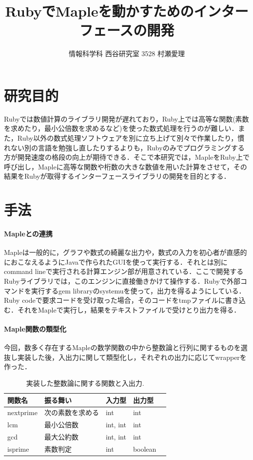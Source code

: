 \documentclass[10pt,a4j,twocolumn]{jsarticle}
\begin{document}
\title{RubyでMapleを動かすためのインターフェースの開発}
\author{情報科学科 西谷研究室 3528 村瀬愛理}
\date{}
\maketitle
\section{研究目的}
\vspace{-0.5em}
Rubyでは数値計算のライブラリ開発が遅れており，Ruby上では高等な関数(素数を求めたり，最小公倍数を求めるなど)を使った数式処理を行うのが難しい．また，Ruby以外の数式処理ソフトウェアを別に立ち上げて別々で作業したり，慣れない別の言語を勉強し直したりするよりも，Rubyのみでプログラミングする方が開発速度の格段の向上が期待できる．そこで本研究では，MapleをRuby上で呼び出し，Mapleに高等な関数や桁数の大きな数値を用いた計算をさせて，その結果をRubyが取得するインターフェースライブラリの開発を目的とする．

\section{手法}
\vspace{-0.5em}
\paragraph{Mapleとの連携}
Mapleは一般的に，グラフや数式の綺麗な出力や，数式の入力を初心者が直感的におこなえるようにJavaで作られたGUIを使って実行する．それとは別にcommand lineで実行される計算エンジン部が用意されている．ここで開発するRubyライブラリでは，このエンジンに直接働きかけて操作する．Rubyで外部コマンドを実行するgem libraryのsystemuを使って，出力を得るようにしている．Ruby codeで要求コードを受け取った場合，そのコードをtmpファイルに書き込む．それをMapleで実行し，結果をテキストファイルで受けとり出力を得る．

\paragraph{Maple関数の類型化}
今回，数多く存在するMapleの数学関数の中から整数論と行列に関するものを選抜し実装した後，入出力に関して類型化し，それぞれの出力に応じてwrapperを作った．
\begin{table}[htbp]\begin{center}
\caption{実装した整数論に関する関数と入出力.}
\label{table:one}
\begin{tabular}{lllll}
\hline
関数名  &振る舞い  &入力型  &出力型  \\ \hline
nextprime  &次の素数を求める  &int  &int  \\
lcm  &最小公倍数  &int, int  &int  \\
gcd  &最大公約数  &int, int  &int  \\
isprime  &素数判定  &int  &boolean  \\
\hline
\end{tabular}
\label{default}
\end{center}
\vspace{-2em}
\end{table}
\end{document}
